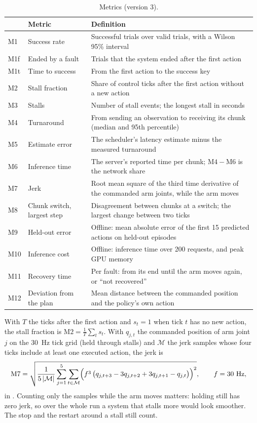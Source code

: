 \begin{table}[htbp]
  \centering
  \small
  \begin{tabularx}{\textwidth}{l l X}
    \toprule
    & Metric & Definition \\
    \midrule
    M1 & Success rate & Successful trials over valid trials, with a Wilson 95\% interval \\
    M1f & Ended by a fault & Trials that the system ended after the first action \\
    M1t & Time to success & From the first action to the success key \\
    M2 & Stall fraction & Share of control ticks after the first action without a new action \\
    M3 & Stalls & Number of stall events; the longest stall in seconds \\
    M4 & Turnaround & From sending an observation to receiving its chunk (median and 95th percentile) \\
    M5 & Estimate error & The scheduler's latency estimate minus the measured turnaround \\
    M6 & Inference time & The server's reported time per chunk; $\mathrm{M4}-\mathrm{M6}$ is the network share \\
    M7 & Jerk & Root mean square of the third time derivative of the commanded arm joints, while the arm moves \\
    M8 & Chunk switch, largest step & Disagreement between chunks at a switch; the largest change between two ticks \\
    M9 & Held-out error & Offline: mean absolute error of the first 15 predicted actions on held-out episodes \\
    M10 & Inference cost & Offline: inference time over 200 requests, and peak GPU memory \\
    M11 & Recovery time & Per fault: from its end until the arm moves again, or \enquote{not recovered} \\
    M12 & Deviation from the plan & Mean distance between the commanded position and the policy's own action \\
    \bottomrule
  \end{tabularx}
  \caption{Metrics (version 3).}\label{tab:metrics}
\end{table}

With $T$ the ticks after the first action and $s_t=1$ when tick $t$ has no new action, the stall fraction is
$\mathrm{M2} = \frac{1}{T}\sum_t s_t$. With $q_{j,t}$ the commanded position of arm joint $j$ on the 30~Hz tick grid
(held through stalls) and $\mathcal{M}$ the jerk samples whose four ticks include at least one executed action, the
jerk is
\begin{equation}
  \mathrm{M7} = \sqrt{\frac{1}{5\,|\mathcal{M}|} \sum_{j=1}^{5} \sum_{t\in\mathcal{M}} \Bigl( f^3\,\bigl(q_{j,t+3}
  - 3q_{j,t+2} + 3q_{j,t+1} - q_{j,t}\bigr) \Bigr)^{2}}, \qquad f = 30~\mathrm{Hz},
\end{equation}
in \jerkunit. Counting only the samples while the arm moves matters: holding still has zero jerk, so over the whole run
a system that stalls more would look smoother. The stop and the restart around a stall still count.

